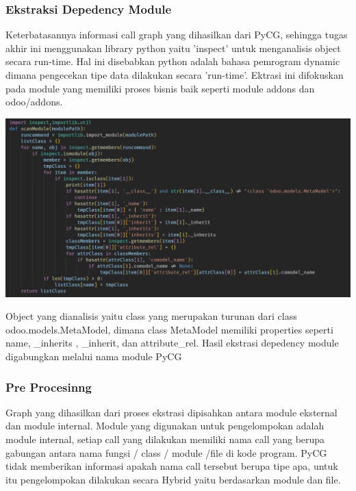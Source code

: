 \subsubsection{Ekstraksi Depedency Module}
Keterbatasannya informasi call graph yang dihasilkan dari PyCG, sehingga tugas akhir ini  menggunakan library python yaitu 'inspect' untuk menganalisis object secara run-time. Hal ini disebabkan python adalah bahasa pemrogram dynamic dimana pengecekan tipe data dilakukan secara 'run-time'. Ektrasi ini difokuskan pada module yang memiliki proses bisnis baik seperti module addons dan odoo/addons.
\begin{center}
	\includegraphics[width=14cm]{img/bab_3/InspectScan.png}
	\label{fig:asd}
\end{center}
Object yang dianalisis yaitu class yang merupakan turunan dari class odoo.models.MetaModel, dimana class MetaModel memiliki properties seperti  name, \_inherits , \_inherit, dan attribute\_rel. Hasil ekstrasi depedency module digabungkan melalui nama module PyCG 
\\
\subsubsection{Pre Procesinng}
Graph yang dihasilkan dari proses ekstrasi dipisahkan antara module eksternal dan module internal. Module yang digunakan untuk pengelompokan adalah module internal, setiap call yang dilakukan memiliki nama call yang berupa gabungan antara nama fungsi / class / module /file di kode program. PyCG tidak memberikan informasi apakah nama call tersebut berupa tipe apa, untuk itu pengelompokan dilakukan secara Hybrid yaitu berdasarkan module dan file. 

